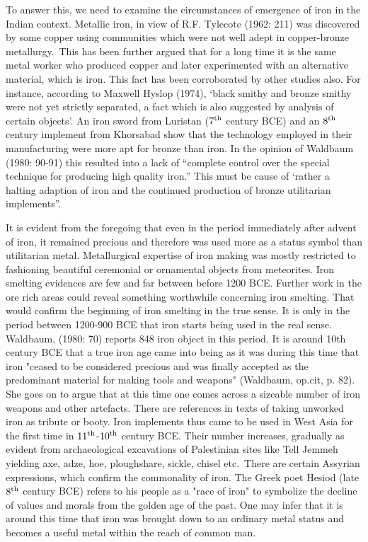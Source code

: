 {To answer this, we need to examine the circumstances of emergence of iron in the Indian context. Metallic iron, in view of R.F. Tylecote (1962: 211) was discovered by some copper using communities which were not well adept in copper-bronze metallurgy.~This has been further argued that for a long time it is the same metal worker who produced copper and later experimented with an alternative material, which is iron. This fact has been corroborated by other studies also. For instance, according to Maxwell Hyslop (1974), ‘black smithy and bronze smithy were not yet strictly separated, a fact which is also suggested by analysis of certain objects’. An iron sword from Luristan ($7^{\rm th}$ century BCE) and an $8^{\rm th}$ century implement from Khorsabad show that the technology employed in their manufacturing were more apt for bronze than iron. In the opinion of Waldbaum (1980: 90-91) this resulted into a lack of “complete control over the special technique for producing high quality iron.” This must be cause of ‘rather a halting adaption of iron and the continued production of bronze utilitarian implements”.

It is evident from the foregoing that even in the period immediately after advent of iron, it remained precious and therefore was used more as a status symbol than utilitarian metal. Metallurgical expertise of iron making was mostly restricted to fashioning beautiful ceremonial or ornamental objects from meteorites. Iron smelting evidences are few and far between before 1200 BCE. Further work in the ore rich areas could reveal something worthwhile concerning iron smelting. That would confirm the beginning of iron smelting in the true sense. It is only in the period between 1200-900 BCE that iron starts being used in the real sense. Waldbaum, (1980: 70) reports 848 iron object in this period. It is around 10th century BCE that a true iron age came into being as it was during this time that iron "ceased to be considered precious and was finally accepted as the predominant material for making tools and weapons" (Waldbaum, op.cit, p. 82). She goes on to argue that at this time one comes across a sizeable number of iron weapons and other artefacts. There are references in texts of taking unworked iron as tribute or booty. Iron implements thus came to be used in West Asia for the first time in $11^{\rm th}$-$10^{\rm th}$ century BCE. Their number increases, gradually as evident from archaeological excavations of Palestinian sites like Tell Jemmeh yielding axe, adze, hoe, ploughshare, sickle, chisel etc.~There are certain Assyrian expressions, which confirm the commonality of iron. The Greek poet Hesiod (late $8^{\rm th}$ century BCE) refers to his people as a "race of iron" to symbolize the decline of values and morals from the golden age of the past. One may infer that it is around this time that iron was brought down to an ordinary metal status and becomes a useful metal within the reach of common man. 

}
